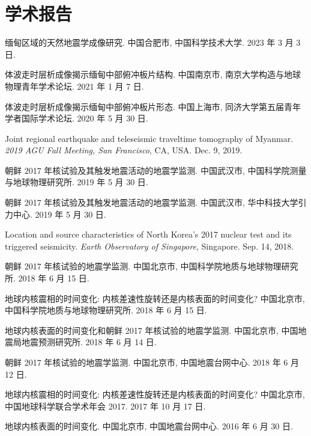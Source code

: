 \section{学术报告}

\newcommand{\Invited}{\textbf{[邀请报告]}}

\begin{etaremune}
\item
    缅甸区域的天然地震学成像研究.
    中国合肥市, 中国科学技术大学.
    2023 年 3 月 3日.
\item
    体波走时层析成像揭示缅甸中部俯冲板片结构.
    中国南京市, 南京大学构造与地球物理青年学术论坛.
    2021 年 1 月 7 日.
\item
    体波走时层析成像揭示缅甸中部俯冲板片形态.
    中国上海市, 同济大学第五届青年学者国际学术论坛.
    2020 年 5 月 30 日.
\item
    Joint regional earthquake and teleseismic traveltime tomography of Myanmar.
    \textit{2019 AGU Fall Meeting, San Francisco}, CA, USA.
    Dec. 9, 2019.
\item
    朝鲜 2017 年核试验及其触发地震活动的地震学监测.
    中国武汉市, 中国科学院测量与地球物理研究所.
    2019 年 5 月 30 日.
\item
    朝鲜 2017 年核试验及其触发地震活动的地震学监测.
    中国武汉市, 华中科技大学引力中心.
    2019 年 5 月 30 日.
\item
    Location and source characteristics of North Korea's 2017 nuclear test and its triggered seismicity.
    \textit{Earth Observatory of Singapore}, Singapore.
    Sep. 14, 2018.
\item
    朝鲜 2017 年核试验的地震学监测.
    中国北京市, 中国科学院地质与地球物理研究所.
    2018 年 6 月 15 日.
\item
    地球内核震相的时间变化: 内核差速性旋转还是内核表面的时间变化?
    中国北京市, 中国科学院地质与地球物理研究所.
    2018 年 6 月 15 日.
\item
    地球内核表面的时间变化和朝鲜 2017 年核试验的地震学监测.
    中国北京市, 中国地震局地震预测研究所.
    2018 年 6 月 14 日.
\item
    朝鲜 2017 年核试验的地震学监测.
    中国北京市, 中国地震台网中心.
    2018 年 6 月 12 日.
\item
    地球内核震相的时间变化: 内核差速性旋转还是内核表面的时间变化?
    中国北京市, 中国地球科学联合学术年会 2017.
    2017 年 10 月 17 日.
\item
    地球内核表面的时间变化.
    中国北京市, 中国地震台网中心.
    2016 年 6 月 30 日.
\end{etaremune}
